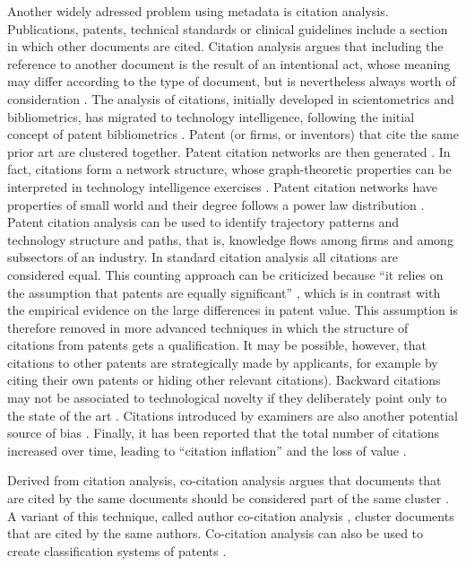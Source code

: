 \documentclass[]{book}
\begin{document}
Another widely adressed problem using metadata is citation analysis.
Publications, patents, technical standards or clinical guidelines
include a section in which other documents are cited. Citation analysis
argues that including the reference to another document is the result of
an intentional act, whose meaning may differ according to the type of
document, but is nevertheless always worth of consideration
\citep{moed2006citation}. The analysis of citations, initially developed
in scientometrics and bibliometrics, has migrated to technology
intelligence, following the initial concept of patent bibliometrics
\citep{narin1994patent}. Patent (or firms, or inventors) that cite the
same prior art are clustered together. Patent citation networks are then
generated \citep[\citet{erdi2013prediction}]{karki1997patent}. In fact,
citations form a network structure, whose graph-theoretic properties can
be interpreted in technology intelligence exercises
\citep{lee2017knowledge}. Patent citation networks have properties of
small world \citep{cowan2004network} and their degree follows a power
law distribution \citep{chen2004tracing}. Patent citation analysis can
be used to identify trajectory patterns and technology structure and
paths, that is, knowledge flows among firms and among subsectors of an
industry. In standard citation analysis all citations are considered
equal. This counting approach can be criticized because ``it relies on
the assumption that patents are equally significant''
\citep{gerken2012new}, which is in contrast with the empirical evidence
on the large differences in patent value. This assumption is therefore
removed in more advanced techniques in which the structure of citations
from patents gets a qualification. It may be possible, however, that
citations to other patents are strategically made by applicants, for
example by citing their own patents or hiding other relevant citations).
Backward citations may not be associated to technological novelty if
they deliberately point only to the state of the art
\citep{rost2011strength}. Citations introduced by examiners are also
another potential source of bias \citep{alcacer2006patent}. Finally, it
has been reported that the total number of citations increased over
time, leading to ``citation inflation'' and the loss of value
\citep{hall2001nber}.

Derived from citation analysis, co-citation analysis argues that
documents that are cited by the same documents should be considered part
of the same cluster
\citep[\citet{small1985clustering}]{small2006tracking}. A variant of
this technique, called author co-citation analysis
\citep{white1981author}, cluster documents that are cited by the same
authors. Co-citation analysis can also be used to create classification
systems of patents \citep{lai2005using}.
\end{document}
